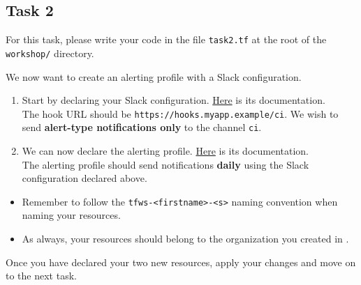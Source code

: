 \subsection{Task 2}\label{sec:task2}

\begin{note}
For this task, please write your code in the file \texttt{task2.tf}
at the root of the \texttt{workshop/} directory.
\end{note}

We now want to create an alerting profile with a Slack configuration.

\begin{enumerate}
  \item Start by declaring your Slack configuration.
  \href{https://intuinewin.github.io/taikun-docs/resources/slack_configuration.html}{Here} is its documentation.\\

The hook URL should be \texttt{https://hooks.myapp.example/ci}.
We wish to send \textbf{alert-type notifications only} to the channel \texttt{ci}.
  \item We can now declare the alerting profile.
    \href{https://intuinewin.github.io/taikun-docs/resources/alerting_profile.html}{Here} is its documentation.\\
    The alerting profile should send notifications \textbf{daily} using the Slack configuration declared above.
\end{enumerate}

\begin{warn}
  \begin{itemize}
    \item Remember to follow the \texttt{tfws-<firstname>-<s>} naming convention when naming your resources.
    \item As always, your resources should belong to the organization you created in .
  \end{itemize}
\end{warn}

Once you have declared your two new resources, apply your changes and move on to the next task.
